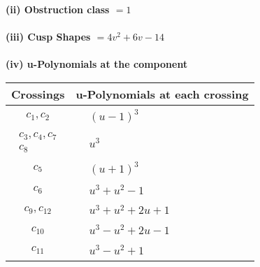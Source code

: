 \documentclass[1p]{elsarticle_modified}
\theoremstyle{definition}
\begin{document}
\flushleft \textbf{(ii) Obstruction class $= 1$}\\~\\
\flushleft \textbf{(iii) Cusp Shapes $= 4 v^2+6 v-14$}\\~\\
\newpage\renewcommand{\arraystretch}{1}
\flushleft \textbf{(iv) u-Polynomials at the component}\newline \\
\begin{tabular}{m{50pt}|m{274pt}}
Crossings & \hspace{64pt}u-Polynomials at each crossing \\
\hline $$\begin{aligned}c_{1},c_{2}\end{aligned}$$&$\begin{aligned}
&(u-1)^3
\end{aligned}$\\
\hline $$\begin{aligned}c_{3},c_{4},c_{7}\\c_{8}\end{aligned}$$&$\begin{aligned}
&u^3
\end{aligned}$\\
\hline $$\begin{aligned}c_{5}\end{aligned}$$&$\begin{aligned}
&(u+1)^3
\end{aligned}$\\
\hline $$\begin{aligned}c_{6}\end{aligned}$$&$\begin{aligned}
&u^3+u^2-1
\end{aligned}$\\
\hline $$\begin{aligned}c_{9},c_{12}\end{aligned}$$&$\begin{aligned}
&u^3+u^2+2 u+1
\end{aligned}$\\
\hline $$\begin{aligned}c_{10}\end{aligned}$$&$\begin{aligned}
&u^3- u^2+2 u-1
\end{aligned}$\\
\hline $$\begin{aligned}c_{11}\end{aligned}$$&$\begin{aligned}
&u^3- u^2+1
\end{aligned}$\\
\hline
\end{tabular}\\~\\
\end{document}
